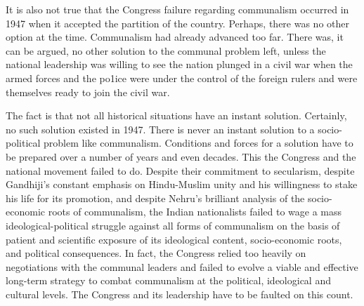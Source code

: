 It is also not true that the Congress failure regarding communalism occurred in 1947 when it accepted the partition of the country. Perhaps, there was no other option at the time. Communalism had already advanced too far. There was, it can be argued, no other solution to the communal problem left, unless the national leadership was willing to see the nation plunged in a civil war when the armed forces and the po1ice were under the control of the foreign rulers and were themselves ready to join the civil war. 

The fact is that not all historical situations have an instant solution. Certainly, no such solution existed in 1947. There is never an instant solution to a socio-political problem like communalism. Conditions and forces for a solution have to be prepared over a number of years and even decades. This the Congress and the national movement failed to do. Despite their commitment to secularism, despite Gandhiji's constant emphasis on Hindu-Muslim unity and his willingness to stake his life for its promotion, and despite Nehru's brilliant analysis of the socio-economic roots of communalism, the Indian nationalists failed to wage a mass ideological-political struggle against all forms of communalism on the basis of patient and scientific exposure of its ideological content, socio-economic roots, and political consequences. In fact, the Congress relied too heavily on negotiations with the communal leaders and failed to evolve a viable and effective long-term strategy to combat communalism at the political, ideological and cultural levels. The Congress and its leadership have to be faulted on this count.
